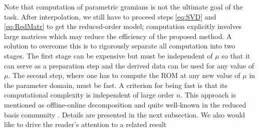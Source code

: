 Note that computation of parametric gramians is not the ultimate goal of the task. After interpolation, we still have to proceed steps \eqref{eq:SVD} and \eqref{eq:RedMatr} to get the reduced-order model; computation explicitly involves large matrices which may reduce the efficiency of the proposed method. %
A solution to overcome this is to rigorously separate all computation into two stages. The first stage can be expensive but must be independent of $\mu$ so that it can serve as a preparation step and the derived data can be used for any value of $\mu$.  The second step, where one has to compute the ROM at any new value of $\mu$ in the parameter domain, must be fast. A criterion for being fast is that its computational complexity is independent of large order $n$. This approach is mentioned as offline-online decomposition and quite well-known in the reduced basis community \cite{PateR07,HeRS16}.  Details are presented in the next subsection. We also would like to drive the reader's attention to a related result %


